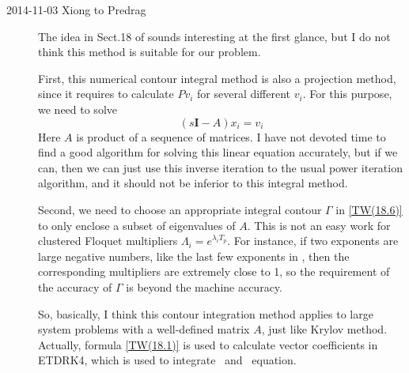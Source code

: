 \begin{description}
\item[2014-11-03 Xiong to Predrag]
The idea in Sect.18 of  sounds interesting
at the first glance, but I do not think this method is suitable
for our problem.

First, this numerical contour integral method
is also a projection method, since
it requires to calculate $Pv_i$ for several different $v_i$. For
this purpose, we need to solve
\[
(s\mathbf{I}-A)x_i=v_i
\]
Here $A$ is product of a sequence of matrices.
I have not devoted time to find a good algorithm for
solving this linear
equation accurately, but if we can, then we can just use this
inverse iteration to the usual power iteration algorithm, and
it should not be inferior to this integral method.

Second,
we need to choose an appropriate integral contour $\Gamma$ in
\eqref{TW(18.6)} to only enclose a subset of eigenvalues of
$A$. This is not an easy work for clustered Floquet multipliers
$\Lambda_i = e^{\lambda_i T_p}$.
For instance, if two exponents are large negative
numbers, like the last few exponents in \KSe, then the
corresponding multipliers are extremely close to 1, so the
requirement of the accuracy of $\Gamma$ is beyond the machine
accuracy.

So, basically, I think this contour integration method
applies to large system problems with a well-defined matrix
$A$, just like Krylov method.
Actually, formula \eqref{TW(18.1)} is used to
calculate vector coefficients in ETDRK4, which is
used to integrate \KSe\ and \cqcGL\
equation.

\end{description}
